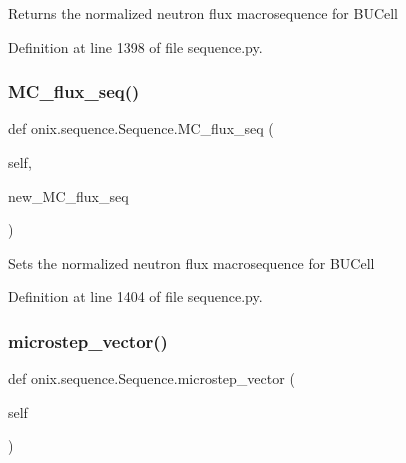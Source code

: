 \begin{DoxyVerb}Returns the normalized neutron flux macrosequence for BUCell
\end{DoxyVerb}
 

Definition at line 1398 of file sequence.\+py.

\mbox{\label{classonix_1_1sequence_1_1Sequence_ac66ace90ed4548588adcc1c2dc182d61}} 
\subsubsection{\texorpdfstring{M\+C\+\_\+flux\+\_\+seq()}{MC\_flux\_seq()}\hspace{0.1cm}{\footnotesize\ttfamily [2/2]}}
{\footnotesize\ttfamily def onix.\+sequence.\+Sequence.\+M\+C\+\_\+flux\+\_\+seq (\begin{DoxyParamCaption}\item[{}]{self,  }\item[{}]{new\+\_\+\+M\+C\+\_\+flux\+\_\+seq }\end{DoxyParamCaption})}

\begin{DoxyVerb}Sets the normalized neutron flux macrosequence for BUCell
\end{DoxyVerb}
 

Definition at line 1404 of file sequence.\+py.

\mbox{\label{classonix_1_1sequence_1_1Sequence_a462b334d5ffd3b393ed52f0c34afa97c}} 
\subsubsection{\texorpdfstring{microstep\+\_\+vector()}{microstep\_vector()}\hspace{0.1cm}{\footnotesize\ttfamily [1/2]}}
{\footnotesize\ttfamily def onix.\+sequence.\+Sequence.\+microstep\+\_\+vector (\begin{DoxyParamCaption}\item[{}]{self }\end{DoxyParamCaption})}

